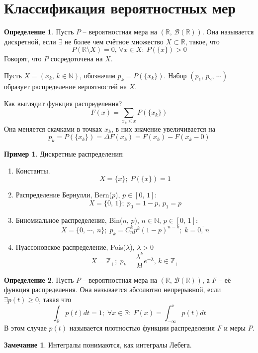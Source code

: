 \documentclass[a4paper,12pt]{article}
\renewcommand{\leq}{\ensuremath{\leqslant}}
\renewcommand{\geq}{\ensuremath{\geqslant}}
\theoremstyle{plain}
\theoremstyle{definition}
\newtheorem{definition}{Определение}[section]
\newtheorem*{note}{Замечание}
\newtheorem*{example}{Пример}
\theoremstyle{remark}
\begin{document}
\section{Классификация вероятностных мер}
\begin{definition}
	Пусть $P$ -- вероятностная мера на $(\mathbb{R},\, \mathcal{B}(\mathbb{R}))$. Она называется дискретной, если $\exists$ не более чем счётное множество $X \subset \mathbb{R}$, такое, что
	\[P(\mathbb{R} \setminus X) = 0,\, \forall x \in X:\: P(\{x\}) > 0\]
	Говорят, что $P$ сосредоточена на $X$.

	Пусть $X = (x_k,\, k \in \mathbb{N})$, обозначим $p_k = P(\{x_k\})$. Набор $(p_1,\,p_2,\,\cdots)$ образует распределение вероятностей на $X$.

	Как выглядит функция распределения?
	\[F(x) = \sum_{x_k \leq x}P(\{x_k\})\]
	Она меняется скачками в точках $x_k$, в них значение увеличивается на
	\[p_k = P(\{x_k\}) = \Delta F(x_k) = F(x_k) - F(x_k - 0)\]
\end{definition}

\begin{example}
	Дискретные распределения:
	\begin{enumerate}
		\item Константы.
		      \[X = \{x\};\; P(\{x\}) = 1\]
		\item Распределение Бернулли, Bern($p$), $p \in [0,\,1]$:
		      \[X = \{0,\, 1\};\; p_0 = 1 - p,\, p_1 = p\]
		\item Биномиальное распределение, Bin($n,\,p$), $n \in \mathbb{N},\, p \in [0,\,1]$:
		      \[X = \{0,\,\cdots,\,n\};\; p_k = C_n^k p^k (1-p)^{n - k};\; k = \overline{0,\,n}\]
		\item Пуассоновское распределение, Pois($\lambda$), $\lambda > 0$
		      \[X = \mathbb{Z}_+;\; p_k = \frac{\lambda^k}{k!}e^{-\lambda},\, k \in \mathbb{Z}_+\]
	\end{enumerate}
\end{example}

\begin{definition}
	Пусть $P$ -- вероятностная мера на $(\mathbb{R},\, \mathcal{B}(\mathbb{R}))$, а $F$ -- её функция распределения. Она называется абсолютно непрерывной, если $\exists p(t) \geq 0$, такая что
	\[\int_\mathbb{R}p(t)dt = 1;\; \forall x \in \mathbb{R} :\: F(x) = \int_{-\infty}^x p(t)dt\]
	В этом случае $p(t)$ называется плотностью функции распределения $F$ и меры $P$.
\end{definition}

\begin{note}
	Интегралы понимаются, как интегралы Лебега.
\end{note}
\end{document}
